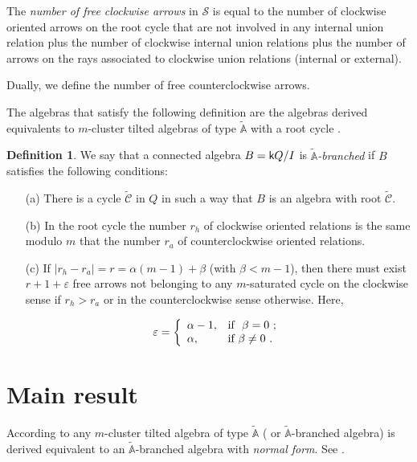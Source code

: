 \documentclass{amsart}
\theoremstyle{plain}
\theoremstyle{definition}
\newtheorem{defi}[teo]{Definition}
\begin{document}
The   \textit{number of free clockwise arrows} in $\mathcal{S}$ is equal to the number of clockwise oriented arrows on the root cycle that are not  involved in any internal union relation   plus the number of clockwise  internal union relations  plus the number of arrows on the rays associated to clockwise union relations  (internal or external).

Dually, we define the number  of free counterclockwise arrows.

The algebras that satisfy the following definition are the algebras derived equivalents to $m$-cluster tilted algebras of type $\widetilde{\mathbb{A}}$ with a root cycle \cite[Theorem 6.4]{Gub1}.

\begin{defi}
We say that a connected algebra  $B={{\normalfont{\textsf{k}}}} Q/I$  is \textit{$\tilde{\mathbb{A}}$}\textit{-branched}  if $B$ satisfies the following conditions:

\begin{itemize}
\item [(a)] There is a  cycle $\widetilde{\mathcal{C}}$ in $Q$ in such a way that $B$ is an algebra with root $\widetilde{\mathcal{C}}$.
\item [(b)] In the root cycle  the number  $r_h$  of clockwise oriented relations is the same modulo  $m$  that the number  $r_a$ of counterclockwise oriented relations.
\item [(c)] If $|r_h-r_a|=r=\alpha (m-1) + \beta$ (with $\beta< m-1$), then there must exist $r+1+\varepsilon$ free arrows  not belonging to any   $m$-saturated cycle on the clockwise sense if  $r_h>r_a$ or in the counterclockwise sense otherwise. Here,

    $$\varepsilon =\left\{
              \begin{array}{ll}
                \alpha - 1, & \hbox{\text{if }  $\beta=0$ ;} \\
                \alpha, & \hbox{\text{if}  $\beta\neq 0$ .}
              \end{array}
            \right.$$
\end{itemize}

\end{defi}

\section{Main result}

According to \cite[Theorem 6.4]{Gub1} any $m$-cluster tilted algebra of type $\tilde{\mathbb{A}}$ ( or $\tilde{\mathbb{A}}$-branched algebra) is derived equivalent to  an  $\tilde{\mathbb{A}}$-branched algebra with \textit{normal form}. See \cite[Definitions 4.1 and 4.3]{Gub1}.
\end{document}
